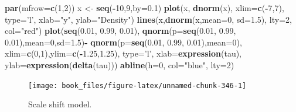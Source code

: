 \documentclass[b5paper,]{scrbook}
\makeatletter
\newenvironment{Shaded}{\begin{snugshade}}{\end{snugshade}}
\newcommand{\DataTypeTok}[1]{\textcolor[rgb]{0.13,0.29,0.53}{#1}}
\newcommand{\DecValTok}[1]{\textcolor[rgb]{0.00,0.00,0.81}{#1}}
\newcommand{\FloatTok}[1]{\textcolor[rgb]{0.00,0.00,0.81}{#1}}
\newcommand{\KeywordTok}[1]{\textcolor[rgb]{0.13,0.29,0.53}{\textbf{#1}}}
\newcommand{\NormalTok}[1]{#1}
\newcommand{\OperatorTok}[1]{\textcolor[rgb]{0.81,0.36,0.00}{\textbf{#1}}}
\newcommand{\StringTok}[1]{\textcolor[rgb]{0.31,0.60,0.02}{#1}}
\theoremstyle{plain}
\theoremstyle{definition}
\numberwithin{equation}{section}
\newenvironment{kframe}{%
\medskip{}
\setlength{\fboxsep}{.8em}
 \def\at@end@of@kframe{}%
 \ifinner\ifhmode%
  \def\at@end@of@kframe{\end{minipage}}%
  \begin{minipage}{\columnwidth}%
 \fi\fi%
 \def\FrameCommand##1{\hskip\@totalleftmargin \hskip-\fboxsep
 \colorbox{shadecolor}{##1}\hskip-\fboxsep
     \hskip-\linewidth \hskip-\@totalleftmargin \hskip\columnwidth}%
 \MakeFramed {\advance\hsize-\width
   \@totalleftmargin\z@ \linewidth\hsize
   \@setminipage}}%
 {\par\unskip\endMakeFramed%
 \at@end@of@kframe}
\renewenvironment{Shaded}{\begin{kframe}}{\end{kframe}}
\makeatother
\begin{document}
\begin{Shaded}
\begin{Highlighting}[]
\KeywordTok{par}\NormalTok{(}\DataTypeTok{mfrow=}\KeywordTok{c}\NormalTok{(}\DecValTok{1}\NormalTok{,}\DecValTok{2}\NormalTok{))}
\NormalTok{x <-}\StringTok{ }\KeywordTok{seq}\NormalTok{(}\OperatorTok{-}\DecValTok{10}\NormalTok{,}\DecValTok{9}\NormalTok{,}\DataTypeTok{by=}\FloatTok{0.1}\NormalTok{)}
\KeywordTok{plot}\NormalTok{(x, }\KeywordTok{dnorm}\NormalTok{(x), }\DataTypeTok{xlim=}\KeywordTok{c}\NormalTok{(}\OperatorTok{-}\DecValTok{7}\NormalTok{,}\DecValTok{7}\NormalTok{), }\DataTypeTok{type=}\StringTok{'l'}\NormalTok{, }\DataTypeTok{xlab=}\StringTok{"y"}\NormalTok{, }\DataTypeTok{ylab=}\StringTok{"Density"}\NormalTok{)}
\KeywordTok{lines}\NormalTok{(x,}\KeywordTok{dnorm}\NormalTok{(x,}\DataTypeTok{mean=}\DecValTok{0}\NormalTok{, }\DataTypeTok{sd=}\FloatTok{1.5}\NormalTok{), }\DataTypeTok{lty=}\DecValTok{2}\NormalTok{, }\DataTypeTok{col=}\StringTok{"red"}\NormalTok{)}
\KeywordTok{plot}\NormalTok{(}\KeywordTok{seq}\NormalTok{(}\FloatTok{0.01}\NormalTok{, }\FloatTok{0.99}\NormalTok{, }\FloatTok{0.01}\NormalTok{), }\KeywordTok{qnorm}\NormalTok{(}\DataTypeTok{p=}\KeywordTok{seq}\NormalTok{(}\FloatTok{0.01}\NormalTok{, }\FloatTok{0.99}\NormalTok{, }\FloatTok{0.01}\NormalTok{),}\DataTypeTok{mean=}\DecValTok{0}\NormalTok{,}\DataTypeTok{sd=}\FloatTok{1.5}\NormalTok{)}\OperatorTok{-}\StringTok{ }\KeywordTok{qnorm}\NormalTok{(}\DataTypeTok{p=}\KeywordTok{seq}\NormalTok{(}\FloatTok{0.01}\NormalTok{, }\FloatTok{0.99}\NormalTok{, }\FloatTok{0.01}\NormalTok{),}\DataTypeTok{mean=}\DecValTok{0}\NormalTok{), }\DataTypeTok{xlim=}\KeywordTok{c}\NormalTok{(}\DecValTok{0}\NormalTok{,}\DecValTok{1}\NormalTok{),}\DataTypeTok{ylim=}\KeywordTok{c}\NormalTok{(}\OperatorTok{-}\FloatTok{1.25}\NormalTok{,}\FloatTok{1.25}\NormalTok{), }\DataTypeTok{type=}\StringTok{'l'}\NormalTok{, }\DataTypeTok{xlab=}\KeywordTok{expression}\NormalTok{(tau), }\DataTypeTok{ylab=}\KeywordTok{expression}\NormalTok{(}\KeywordTok{delta}\NormalTok{(tau)))}
\KeywordTok{abline}\NormalTok{(}\DataTypeTok{h=}\DecValTok{0}\NormalTok{, }\DataTypeTok{col=}\StringTok{"blue"}\NormalTok{, }\DataTypeTok{lty=}\DecValTok{2}\NormalTok{)}
\end{Highlighting}
\end{Shaded}

\begin{figure}

{\centering \texttt{[image: book\_files/figure-latex/unnamed-chunk-346-1]} 

}

\caption{Scale shift model.}\label{fig:unnamed-chunk-346}
\end{figure}
\end{document}
